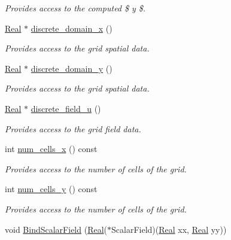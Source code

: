 \begin{DoxyCompactItemize}
\begin{DoxyCompactList}\small\item\em Provides access to the computed \$  y \$. \end{DoxyCompactList}\item 
\hyperlink{group__c01-roots_gac080bbbf5cbb5502c9f00405f894857d}{Real} $\ast$ \hyperlink{classmtk_1_1UniStgGrid2D_ad5dcac20a90f77a96fb7e843f791eba0}{discrete\-\_\-domain\-\_\-x} ()
\begin{DoxyCompactList}\small\item\em Provides access to the grid spatial data. \end{DoxyCompactList}\item 
\hyperlink{group__c01-roots_gac080bbbf5cbb5502c9f00405f894857d}{Real} $\ast$ \hyperlink{classmtk_1_1UniStgGrid2D_abea1624fd9db856806966151df0ca969}{discrete\-\_\-domain\-\_\-y} ()
\begin{DoxyCompactList}\small\item\em Provides access to the grid spatial data. \end{DoxyCompactList}\item 
\hyperlink{group__c01-roots_gac080bbbf5cbb5502c9f00405f894857d}{Real} $\ast$ \hyperlink{classmtk_1_1UniStgGrid2D_a2549284216031dacc97028bf5d27162f}{discrete\-\_\-field\-\_\-u} ()
\begin{DoxyCompactList}\small\item\em Provides access to the grid field data. \end{DoxyCompactList}\item 
int \hyperlink{classmtk_1_1UniStgGrid2D_a2d182866a398aba8e4829590e85bf939}{num\-\_\-cells\-\_\-x} () const 
\begin{DoxyCompactList}\small\item\em Provides access to the number of cells of the grid. \end{DoxyCompactList}\item 
int \hyperlink{classmtk_1_1UniStgGrid2D_aed05a801cc9a76dba0ff203cea58a61a}{num\-\_\-cells\-\_\-y} () const 
\begin{DoxyCompactList}\small\item\em Provides access to the number of cells of the grid. \end{DoxyCompactList}\item 
void \hyperlink{classmtk_1_1UniStgGrid2D_ab6aff36e9f89fba1c1ff4f9914508211}{Bind\-Scalar\-Field} (\hyperlink{group__c01-roots_gac080bbbf5cbb5502c9f00405f894857d}{Real}($\ast$Scalar\-Field)(\hyperlink{group__c01-roots_gac080bbbf5cbb5502c9f00405f894857d}{Real} xx, \hyperlink{group__c01-roots_gac080bbbf5cbb5502c9f00405f894857d}{Real} yy))

\end{DoxyCompactItemize}
